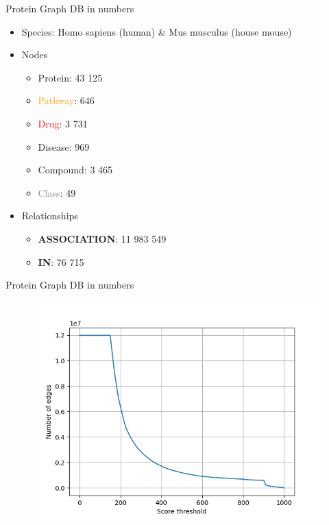 \documentclass{beamer}
\begin{document}
\begin{frame}{Protein Graph DB in numbers}
\begin{itemize}
    \item Species: Homo sapiens (human) \& Mus musculus (house mouse)
    \vfill
    \item Nodes
    \begin{itemize}
        \item \textcolor{protein}{Protein}: 43 125
        \item \textcolor{orange}{Pathway}: 646
        \item \textcolor{red}{Drug}: 3 731
        \item \textcolor{disease}{Disease}: 969
        \item \textcolor{compound}{Compound}: 3 465
        \item \textcolor{gray}{Class}: 49
    \end{itemize}
    \vfill
    \item Relationships
        \begin{itemize}
        \item \textbf{ASSOCIATION}: 11 983 549
        \item \textbf{IN}: 76 715
    \end{itemize} 
\end{itemize}
\end{frame}

\begin{frame}{Protein Graph DB in numbers}
    \begin{figure}
        \centering
        \includegraphics[width=0.8\linewidth]{threshold_vs_edges.png}
    \end{figure}
\end{frame}
\end{document}
